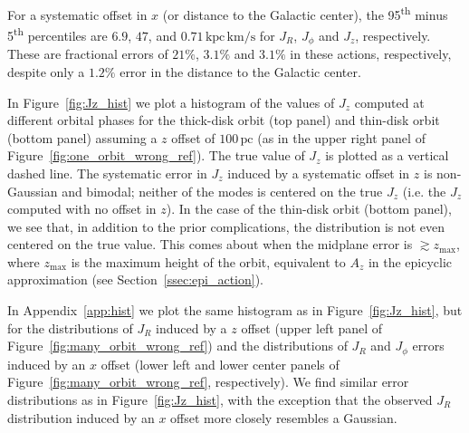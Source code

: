 \documentclass[twocolumn]{aastex62}
\newcommand{\pc}{\text{pc}}
\newcommand{\kms}{\text{km}/\text{s}}
\newcommand{\actunit}{\text{kpc}\,\kms}
\begin{document}
For a systematic offset in $x$ (or distance to the Galactic center), the
95\textsuperscript{th} minus 5\textsuperscript{th} percentiles are $6.9$,
$47$, and $0.71\,\actunit$ for $J_R$, $J_{\phi}$ and $J_z$, respectively.
These are fractional errors of $21\%$, $3.1\%$ and $3.1\%$ in these actions, respectively, despite only a $1.2\%$ error in the distance to the Galactic center.

In Figure~\ref{fig:Jz_hist} we plot a histogram of the values of
$J_z$ computed at different orbital phases for the thick-disk orbit (top panel) and thin-disk orbit (bottom panel)
assuming a $z$ offset of $100\,\pc$ (as in the upper right panel of
Figure~\ref{fig:one_orbit_wrong_ref}). The true value of $J_z$ is plotted as a
vertical dashed line. The systematic error in $J_z$ induced by a
systematic offset in $z$ is non-Gaussian and bimodal; neither of the modes is centered on the true $J_z$ (i.e. the $J_z$ computed with no offset in $z$). In the case of the thin-disk orbit
(bottom panel), we see that, in addition to the prior complications, the
distribution is not even centered on the true value. This comes about when the midplane
error is $\gtrsim z_{\text{max}}$, where $z_{\text{max}}$ is the maximum
height of the orbit, equivalent to $A_z$ in the epicyclic approximation (see
Section~\ref{ssec:epi_action}).

In Appendix~\ref{app:hist} we plot the same histogram as in
Figure~\ref{fig:Jz_hist}, but for the distributions of $J_R$ induced
by a $z$ offset (upper left panel of Figure~\ref{fig:many_orbit_wrong_ref})
and the distributions of $J_R$ and $J_{\phi}$ errors induced by an
$x$ offset (lower left and lower center panels of
Figure~\ref{fig:many_orbit_wrong_ref}, respectively). We find similar error
distributions as in Figure~\ref{fig:Jz_hist}, with the exception that the
observed $J_R$ distribution induced by an $x$ offset more closely resembles a
Gaussian.
\end{document}
